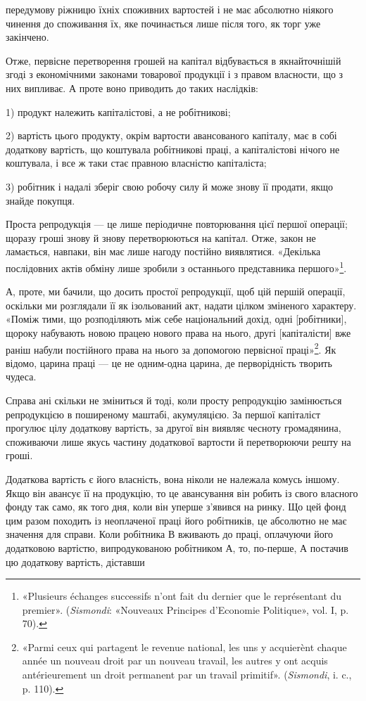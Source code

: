 \parcont{}  %
передумову ріжницю їхніх споживних вартостей і не має абсолютно
ніякого чинення до споживання їх, яке починається лише
після того, як торг уже закінчено.

Отже, первісне перетворення грошей на капітал відбувається
в якнайточнішій згоді з економічними законами товарової продукції
і з правом власности, що з них випливає. А проте воно
приводить до таких наслідків:

1) продукт належить капіталістові, а не робітникові;

2) вартість цього продукту, окрім вартости авансованого капіталу,
має в собі додаткову вартість, що коштувала робітникові
праці, а капіталістові нічого не коштувала, і все ж таки стає
правною власністю капіталіста;

3) робітник і надалі зберіг свою робочу силу й може знову її
продати, якщо знайде покупця.

Проста репродукція — це лише періодичне повторювання
цієї першої операції; щоразу гроші знову й знову перетворюються
на капітал. Отже, закон не ламається, навпаки, він
має лише нагоду постійно виявлятися. «Декілька послідовних
актів обміну лише зробили з останнього представника першого»\footnote*{
«Plusieurs échanges successifs n’ont fait du dernier que le représentant
du premier». (\emph{Sismondi}: «Nouveaux Principes d’Economie Politique»,
vol. I, p. 70).
}.

А, проте, ми бачили, що досить простої репродукції, щоб цій
першій операції, оскільки ми розглядали її як ізольований акт,
надати цілком зміненого характеру. «Поміж тими, що розподіляють
між себе національний дохід, одні [робітники], щороку
набувають новою працею нового права на нього, другі [капіталісти]
вже раніш набули постійного права на нього за допомогою
первісної праці»\footnote*{
«Parmi ceux qui partagent le revenue national, les uns y acquierènt
chaque année un nouveau droit par un nouveau travail, les autres y ont acquis
antérieurement un droit permanent par un travail primitif». (\emph{Sismondi},
i. c., p. 110).
}. Як відомо, царина праці — це не одним-одна
царина, де перворідність творить чудеса.

Справа ані скільки не зміниться й тоді, коли просту репродукцію
замінюється репродукцією в поширеному маштабі, акумуляцією.
За першої капіталіст прогулює цілу додаткову вартість,
за другої він виявляє чесноту громадянина, споживаючи
лише якусь частину додаткової вартости й перетворюючи решту
на гроші.

Додаткова вартість є його власність, вона ніколи не належала
комусь іншому. Якщо він авансує її на продукцію, то це авансування
він робить із свого власного фонду так само, як того
дня, коли він уперше з’явився на ринку. Що цей фонд цим разом
походить із неоплаченої праці його робітників, це абсолютно не
має значення для справи. Коли робітника В вживають до праці,
оплачуючи його додатковою вартістю, випродукованою робітником
А, то, по-перше, А постачив цю додаткову вартість, діставши
\parbreak{}  %
